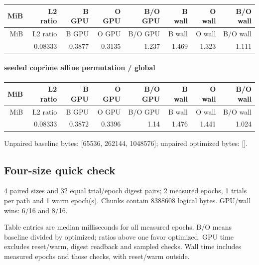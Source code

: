 \begingroup
\scriptsize
\setlength{\tabcolsep}{2.5pt}
\renewcommand{\arraystretch}{1.16}
\begin{longtable}{rrrrrrrr}
\toprule
MiB & L2 ratio & B GPU & O GPU & B/O GPU & B wall & O wall & B/O wall \\
\midrule\endfirsthead
\toprule
MiB & L2 ratio & B GPU & O GPU & B/O GPU & B wall & O wall & B/O wall \\
\midrule\endhead
\bottomrule\endfoot
3 & 0.08333 & 0.3877 & 0.3135 & 1.237 & 1.469 & 1.323 & 1.111 \\
\end{longtable}
\endgroup


\paragraph{seeded coprime affine permutation / global}

\begingroup
\scriptsize
\setlength{\tabcolsep}{2.5pt}
\renewcommand{\arraystretch}{1.16}
\begin{longtable}{rrrrrrrr}
\toprule
MiB & L2 ratio & B GPU & O GPU & B/O GPU & B wall & O wall & B/O wall \\
\midrule\endfirsthead
\toprule
MiB & L2 ratio & B GPU & O GPU & B/O GPU & B wall & O wall & B/O wall \\
\midrule\endhead
\bottomrule\endfoot
3 & 0.08333 & 0.3872 & 0.3396 & 1.14 & 1.476 & 1.441 & 1.024 \\
\end{longtable}
\endgroup

Unpaired baseline bytes: [65536, 262144, 1048576]; unpaired optimized bytes: [].

\subsection{Four-size quick check}

4 paired sizes and 32 equal trial/epoch digest pairs; 2 measured epochs, 1 trials per path and 1 warm epoch(s). Chunks contain 8388608 logical bytes. GPU/wall wins: 6/16 and 8/16.

Table entries are median milliseconds for all measured epochs. B/O means baseline divided by optimized; ratios above one favor optimized. GPU time excludes reset/warm, digest readback and sampled checks. Wall time includes measured epochs and those checks, with reset/warm outside.


